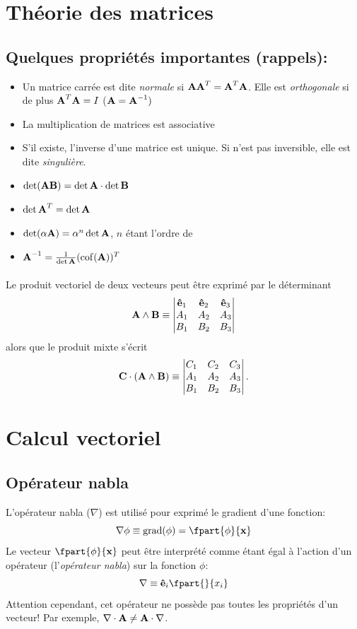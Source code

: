 \section{Théorie des matrices}
\subsection{Quelques propriétés importantes (rappels): }
\begin{itemize}
\item Un matrice carrée  est dite \emph{normale} si $\textbf{A}\textbf{A}^T=\textbf{A}^T\textbf{A}$. Elle est \emph{orthogonale} si de plus $\textbf{A}^T\textbf{A}=I$ ($\textbf{A}=\textbf{A}^{-1})$
\item La multiplication de matrices est associative
\item S'il existe, l'inverse d'une matrice  est unique. Si  n'est pas inversible, elle est dite \emph{singulière}.
\item $\det(\textbf{AB})=\det\textbf{A}\cdot\det\textbf{B}$
\item $\det \textbf{A}^T=\det\textbf{A}$
\item $\det(\alpha\textbf{A})=\alpha^n\det\textbf{A}$, $n$ étant l'ordre de 
\item $\textbf{A}^{-1}=\frac{1}{\det\textbf{A}}(\operatorname{cof}(\textbf{A}))^T$
\end{itemize}
\paragraph*{}
Le produit vectoriel de deux vecteurs peut être exprimé par le déterminant
$$\textbf{A}\wedge\textbf{B}\equiv
\begin{vmatrix}
\textbf{ê}_1 & \textbf{ê}_2 &\textbf{ê}_3\\
A_1 & A_2 &	 A_3\\
B_1 & B_2 & B_3\\
\end{vmatrix}$$
alors que le produit mixte s'écrit
$$\textbf{C}\cdot(\textbf{A}\wedge\textbf{B})\equiv
\begin{vmatrix}
  C_1&C_2&C_3\\
  A_1&A_2&A_3\\
  B_1&B_2&B_3\\
\end{vmatrix}.$$

\section{Calcul vectoriel}
\subsection{Opérateur nabla}
L'opérateur nabla ($\nabla$) est utilisé pour exprimé le gradient d'une fonction: $$\nabla\phi\equiv\mygrad(\phi)=\fpart{\phi}{\fv{x}}$$ Le vecteur $\fpart{\phi}{\fv{x}}$ peut être interprété comme étant égal à l'action d'un opérateur (l'\emph{opérateur nabla}) sur la fonction $\phi$:
$$\nabla\equiv \fv{ê}_i\fpart{}{x_i}$$
Attention cependant, cet opérateur ne possède pas toutes les propriétés d'un vecteur! Par exemple, $\nabla\cdot\textbf{A}\neq\textbf{A}\cdot\nabla$.
